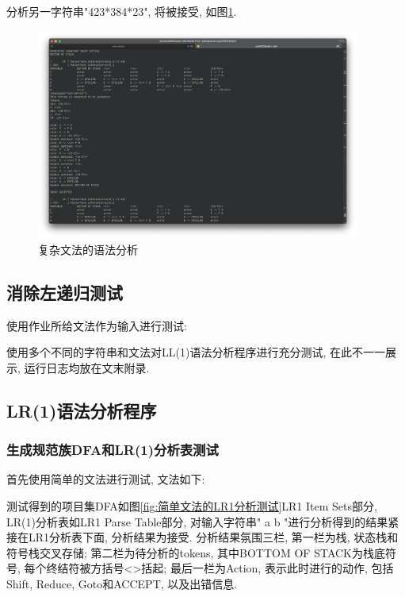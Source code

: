 分析另一字符串"423*384*23", 将被接受, 如图\ref{fig:复杂文法的语法分析2}.

\begin{figure}[ht!]
	\begin{center}
		\includegraphics[width=0.95\textwidth]{figures/ll1分析输入21.png}
	\end{center}
	\caption{复杂文法的语法分析}
	\label{fig:复杂文法的语法分析2}
\end{figure}

\subsection{消除左递归测试}
使用作业所给文法作为输入进行测试:


使用多个不同的字符串和文法对LL(1)语法分析程序进行充分测试, 在此不一一展示,
运行日志均放在文末附录.

\subsection{LR(1)语法分析程序}
\subsubsection{生成规范族DFA和LR(1)分析表测试}

首先使用简单的文法进行测试, 文法如下:


测试得到的项目集DFA如图\ref{fig:简单文法的LR1分析测试}LR1 Item Sets部分,
LR(1)分析表如LR1 Parse Table部分,
对输入字符串"  a  b  "进行分析得到的结果紧接在LR1分析表下面, 分析结果为接受.
分析结果氛围三栏, 第一栏为栈, 状态栈和符号栈交叉存储; 第二栏为待分析的tokens,
其中BOTTOM OF STACK为栈底符号, 每个终结符被方括号<>括起; 最后一栏为Action,
表示此时进行的动作, 包括Shift, Reduce, Goto和ACCEPT, 以及出错信息.

